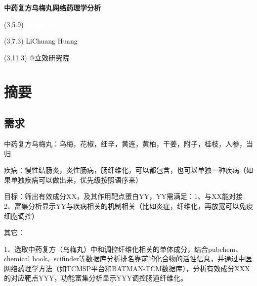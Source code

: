 \documentclass[
]{article}
\author{}
\date{\vspace{-2.5em}}
\begin{document}
\begin{titlepage} 
\begin{center} \textbf{\Huge
中药复方乌梅丸网络药理学分析} \vspace{4em}
\begin{textblock}{10}(3,5.9) \huge
\textbf{\textcolor{white}{2024-04-01}}
\end{textblock} \begin{textblock}{10}(3,7.3)
\Large \textcolor{black}{LiChuang Huang}
\end{textblock} \begin{textblock}{10}(3,11.3)
\Large \textcolor{black}{@立效研究院}
\end{textblock} \end{center} \end{titlepage}
\restoregeometry


\tableofcontents

\listoffigures

\listoftables

\newpage


\hypertarget{abstract}{%
\section{摘要}\label{abstract}}

\hypertarget{ux9700ux6c42}{%
\subsection{需求}\label{ux9700ux6c42}}

中药复方乌梅丸：乌梅，花椒，细辛，黄连，黄柏，干姜，附子，桂枝，人参，当归

疾病：慢性结肠炎，炎性肠病，肠纤维化，可以都包含，也可以单独一种疾病（如果单独疾病可以做出来，优先级按照语序来）

目标：筛出有效成分XX，及其作用靶点蛋白YY，YY需满足：1、与XX能对接 2、富集分析显示YY与疾病相关的机制相关（比如炎症，纤维化，再放宽可以免疫细胞调控）

其它：

1、选取中药复方（乌梅丸）中和调控纤维化相关的单体成分，结合pubchem、chemical book、scifinder等数据库分析排名靠前的化合物的活性信息，并通过中医网络药理学方法（如TCMSP平台和BATMAN-TCM数据库），分析有效成分XXX的对应靶点YYY，功能富集分析显示YYY调控肠道纤维化。
\end{document}
